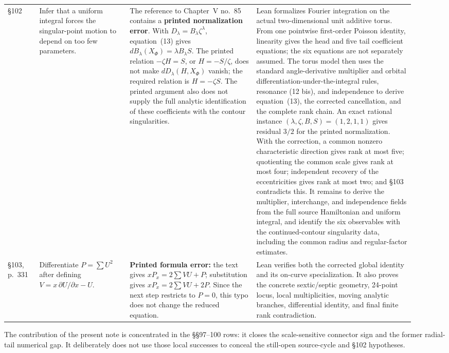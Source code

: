 \documentclass[11pt]{article}
\begin{document}
\begin{landscape}
\begin{longtable}{L{0.075\linewidth}L{0.205\linewidth}L{0.285\linewidth}L{0.355\linewidth}}
\S102 & Infer that a uniform integral forces the singular-point motion to depend on too few
parameters. & The reference to Chapter~V no.~85 contains a \textbf{printed normalization error}.
With $D_\lambda=B_\lambda\zeta^\lambda$, equation~(13) gives
$dB_\lambda(X_\Phi)=\lambda B_\lambda S$.  The printed relation
$-\zeta H=S$, or $H=-S/\zeta$, does not make $dD_\lambda(H,X_\Phi)$ vanish;
the required relation is $H=-\zeta S$.  The printed argument also does not supply the full
analytic identification of these coefficients with the contour singularities. & Lean formalizes
Fourier integration on the actual two-dimensional unit additive torus.  From one pointwise
first-order Poisson identity, linearity gives the head and five tail coefficient equations;
the six equations are not separately assumed.  The torus model then uses the standard
angle-derivative multiplier and orbital differentiation-under-the-integral rules, resonance
(12 bis), and independence to derive equation~(13), the corrected cancellation, and the complete
rank chain.  An exact rational instance
$ (\lambda,\zeta,B,S)=(1,2,1,1) $ gives residual $3/2$ for the printed normalization.  With the
correction, a common nonzero characteristic direction gives rank at most five; quotienting the
common scale gives rank at most four; independent recovery of the eccentricities gives rank at
most two; and \S103 contradicts this.  It remains to derive the multiplier, interchange, and
independence fields from the full source Hamiltonian and uniform integral, and identify the six
observables with the continued-contour singularity data, including the common radius and
regular-factor estimates.\\

\S103, p.~331 & Differentiate \(P=\sum U^2\) after defining
\(V=x\,\partial U/\partial x-U\). & \textbf{Printed formula error:} the text gives
\(xP_x=2\sum VU+P\); substitution gives \(xP_x=2\sum VU+2P\).  Since the next step restricts to
\(P=0\), this typo does not change the reduced equation. & Lean verifies both the corrected global
identity and its on-curve specialization.  It also proves the concrete sextic/septic geometry,
24-point locus, local multiplicities, moving analytic branches, differential identity, and final
finite rank contradiction.\\

\end{longtable}
\end{landscape}
\endgroup

The contribution of the present note is concentrated in the \S\S97--100 rows: it closes the
scale-sensitive connector sign and the former radial-tail numerical gap.  It deliberately does
not use those local successes to conceal the still-open source-cycle and \S102 hypotheses.
\end{document}
